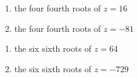 \documentclass{ximera}
\begin{document}
\begin{multicols}{2} 

\begin{enumerate}

\setcounter{enumi}{\value{HW}}

\item  the four fourth roots of $z=16$
\item  the four fourth roots of $z=-81$

\setcounter{HW}{\value{enumi}}

\end{enumerate}

\end{multicols}

\begin{multicols}{2} 

\begin{enumerate}

\setcounter{enumi}{\value{HW}}

\item the six sixth roots of $z = 64$
\item the six sixth roots of $z = -729$ \label{polarrootslast}

\setcounter{HW}{\value{enumi}}

\end{enumerate}

\end{multicols}
\end{document}
